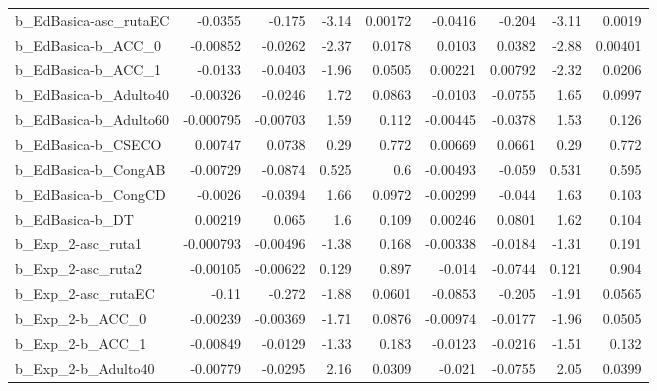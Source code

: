 \begin{tabular}{lrrrrrrrr}
b\_EdBasica-asc\_rutaEC      &     -0.0355 &       -0.175 &    -3.14 &  0.00172 &    -0.0416 &      -0.204 &        -3.11 &        0.0019 \\
b\_EdBasica-b\_ACC\_0         &    -0.00852 &      -0.0262 &    -2.37 &   0.0178 &     0.0103 &      0.0382 &        -2.88 &       0.00401 \\
b\_EdBasica-b\_ACC\_1         &     -0.0133 &      -0.0403 &    -1.96 &   0.0505 &    0.00221 &     0.00792 &        -2.32 &        0.0206 \\
b\_EdBasica-b\_Adulto40      &    -0.00326 &      -0.0246 &     1.72 &   0.0863 &    -0.0103 &     -0.0755 &         1.65 &        0.0997 \\
b\_EdBasica-b\_Adulto60      &   -0.000795 &     -0.00703 &     1.59 &    0.112 &   -0.00445 &     -0.0378 &         1.53 &         0.126 \\
b\_EdBasica-b\_CSECO         &     0.00747 &       0.0738 &     0.29 &    0.772 &    0.00669 &      0.0661 &         0.29 &         0.772 \\
b\_EdBasica-b\_CongAB        &    -0.00729 &      -0.0874 &    0.525 &      0.6 &   -0.00493 &      -0.059 &        0.531 &         0.595 \\
b\_EdBasica-b\_CongCD        &     -0.0026 &      -0.0394 &     1.66 &   0.0972 &   -0.00299 &      -0.044 &         1.63 &         0.103 \\
b\_EdBasica-b\_DT            &     0.00219 &        0.065 &      1.6 &    0.109 &    0.00246 &      0.0801 &         1.62 &         0.104 \\
b\_Exp\_2-asc\_ruta1          &   -0.000793 &     -0.00496 &    -1.38 &    0.168 &   -0.00338 &     -0.0184 &        -1.31 &         0.191 \\
b\_Exp\_2-asc\_ruta2          &    -0.00105 &     -0.00622 &    0.129 &    0.897 &     -0.014 &     -0.0744 &        0.121 &         0.904 \\
b\_Exp\_2-asc\_rutaEC         &       -0.11 &       -0.272 &    -1.88 &   0.0601 &    -0.0853 &      -0.205 &        -1.91 &        0.0565 \\
b\_Exp\_2-b\_ACC\_0            &    -0.00239 &     -0.00369 &    -1.71 &   0.0876 &   -0.00974 &     -0.0177 &        -1.96 &        0.0505 \\
b\_Exp\_2-b\_ACC\_1            &    -0.00849 &      -0.0129 &    -1.33 &    0.183 &    -0.0123 &     -0.0216 &        -1.51 &         0.132 \\
b\_Exp\_2-b\_Adulto40         &    -0.00779 &      -0.0295 &     2.16 &   0.0309 &     -0.021 &     -0.0755 &         2.05 &        0.0399 \\

\end{tabular}
